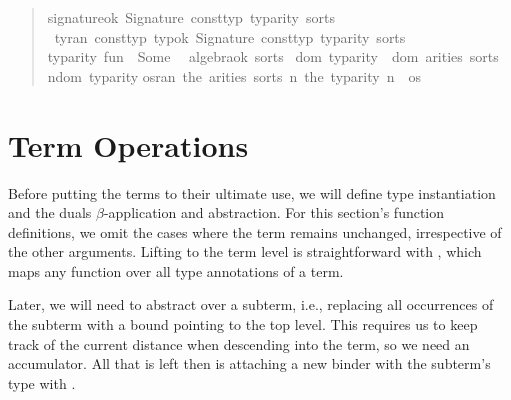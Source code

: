 \begin{quote}
\begin{isabelle}%
 signature{\isacharunderscore}ok\ {\isacharparenleft}Signature\ const{\isacharunderscore}typ\ typ{\isacharunderscore}arity\ sorts{\isacharparenright}\ {\isacharequal}\isanewline
\ {\isacharparenleft}{\isasymforall}ty{\isasymin}ran\ const{\isacharunderscore}typ{\isachardot}\ {\isacharparenleft}typ{\isacharunderscore}ok{\isacharprime}\ {\isacharparenleft}Signature\ const{\isacharunderscore}typ\ typ{\isacharunderscore}arity\ sorts{\isacharparenright}{\isacharparenright}\ {\isasymand}\isanewline
\isaindent{\ }typ{\isacharunderscore}arity\ {\isacharprime}{\isacharprime}fun{\isacharprime}{\isacharprime}\ {\isacharequal}\ Some\ {}\ {\isasymand}\isanewline
\isaindent{\ }algebra{\isacharunderscore}ok\ sorts\ {\isasymand}\isanewline
\isaindent{\ }dom\ typ{\isacharunderscore}arity\ {\isacharequal}\ dom\ {\isacharparenleft}arities\ sorts{\isacharparenright}\ {\isasymand}\isanewline
\isaindent{\ }{\isacharparenleft}{\isasymforall}n{\isasymin}dom\ typ{\isacharunderscore}arity{\isachardot}\isanewline
\isaindent{\ {\isacharparenleft}\ \ \ }{\isasymforall}os{\isasymin}ran\ {\isacharparenleft}the\ {\isacharparenleft}arities\ sorts\ n{\isacharparenright}{\isacharparenright}{\isachardot}\ the\ {\isacharparenleft}typ{\isacharunderscore}arity\ n{\isacharparenright}\ {\isacharequal}\ {\isacharbar}os{\isacharbar}{\isacharparenright}{\isacharparenright}%
\end{isabelle}
\end{quote}

\section{Term Operations}

Before putting the terms to their ultimate use, we will define type instantiation and the duals \(\beta\)-application and abstraction.
For this section's function definitions, we omit the cases where the term remains unchanged, irrespective of the other arguments.
Lifting  to the term level is straightforward with , which maps any function over all type annotations of a term.


Later, we will need to abstract over a subterm, i.e., replacing all occurrences of the subterm with a bound pointing to the top level.
This requires us to keep track of the current distance when descending into the term, so we need an accumulator.
All that is left then is attaching a new binder with the subterm's type with .

